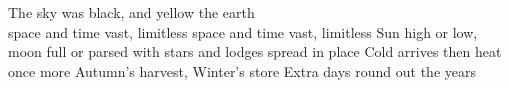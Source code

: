 \begin{mktsToc}%
{\mktsHOne{}\cjkgGlue{} The sky was black, and yellow the earth\\\cjkgGlue{} space and time vast, limitless \dotfill {}\mktsHOneBEG}%
{\mktsHTwo{}\cjkgGlue{} space and time vast, limitless \dotfill {}\mktsHTwoBEG}%
{\mktsHThree{}\cjkgGlue{} Sun high or low, moon full or parsed \dotfill {}\mktsHThreeBEG}%
{\mktsHThree{}\cjkgGlue{} with stars and lodges spread in place \dotfill {}\mktsHThreeBEG}%
{\mktsHTwo{}\cjkgGlue{} Cold arrives then heat once more \dotfill {}\mktsHTwoBEG}%
{\mktsHOne{}\cjkgGlue{} Autumn’s harvest, Winter’s store \dotfill {}\mktsHOneBEG}%
{\mktsHTwo{}\cjkgGlue{} Extra days round out the years \dotfill {}\mktsHTwoBEG}%
\end{mktsToc}%



